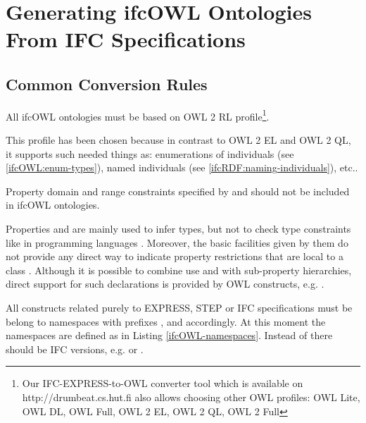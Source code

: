 
\section{Generating ifcOWL Ontologies From IFC Specifications}

\subsection{Common Conversion Rules}


\begin{ontologyRule}
All ifc\-OWL ontologies must be based on OWL 2 RL profile\footnote{Our IFC-EXPRESS-to-OWL converter tool which is available on http://drumbeat.cs.hut.fi also allows choosing other OWL profiles: OWL Lite, OWL DL, OWL Full, OWL 2 EL, OWL 2 QL, OWL 2 Full}.
\end{ontologyRule}

This profile has been chosen because in contrast to OWL 2 EL and OWL 2 QL, it supports such needed things as: enumerations of individuals (see \ref{ifcOWL:enum-types}), named individuals (see \ref{ifcRDF:naming-individuals}), etc.\cite{w3c:owl2-profiles}.

\begin{ontologyRule}
Property domain and range constraints specified by  and  should not be included in ifcOWL ontologies.
\end{ontologyRule}

Properties  and  are mainly used to infer types, but not to check type constraints like in programming languages \cite{w3c:owl-guide}. Moreover, the basic facilities given by them do not provide any direct way to indicate property restrictions that are local to a class \cite{w3c:rdf-schema}. Although it is possible to combine use  and  with sub-property hierarchies, direct support for such declarations is provided by OWL constructs, e.g. . 

\begin{ontologyRule}
All constructs related purely to EXPRESS, STEP or IFC specifications must be belong to namespaces with prefixes ,  and  accordingly. At this moment the namespaces are defined as in Listing \ref{ifcOWL-namespaces}. Instead of  there should be IFC versions, e.g.  or .
\end{ontologyRule}

